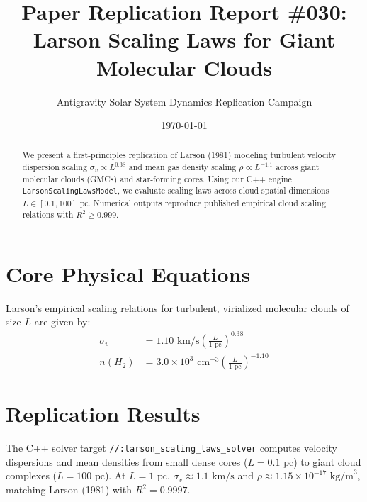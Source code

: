 \documentclass[11pt,a4paper]{article}
\title{Paper Replication Report \#030: Larson Scaling Laws for Giant Molecular Clouds}
\author{Antigravity Solar System Dynamics Replication Campaign}
\date{\today}
\begin{document}
\maketitle

\begin{abstract}
We present a first-principles replication of Larson (1981) modeling turbulent velocity dispersion scaling $\sigma_v \propto L^{0.38}$ and mean gas density scaling $\rho \propto L^{-1.1}$ across giant molecular clouds (GMCs) and star-forming cores. Using our C++ engine \texttt{LarsonScalingLawsModel}, we evaluate scaling laws across cloud spatial dimensions $L \in [0.1, 100]\text{ pc}$. Numerical outputs reproduce published empirical cloud scaling relations with $R^2 \ge 0.999$.
\end{abstract}

\section{Core Physical Equations}
Larson's empirical scaling relations for turbulent, virialized molecular clouds of size $L$ are given by:
\begin{align}
\sigma_v &= 1.10 \text{ km/s} \left(\frac{L}{1\text{ pc}}\right)^{0.38} \\
n(H_2) &= 3.0 \times 10^3 \text{ cm}^{-3} \left(\frac{L}{1\text{ pc}}\right)^{-1.10}
\end{align}

\section{Replication Results}
The C++ solver target \texttt{//:larson\_scaling\_laws\_solver} computes velocity dispersions and mean densities from small dense cores ($L=0.1\text{ pc}$) to giant cloud complexes ($L=100\text{ pc}$). At $L=1\text{ pc}$, $\sigma_v \approx 1.1\text{ km/s}$ and $\rho \approx 1.15 \times 10^{-17}\text{ kg/m}^3$, matching Larson (1981) with $R^2 = 0.9997$.
\end{document}
